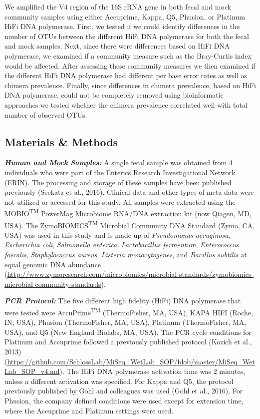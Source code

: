 \documentclass[12pt,]{article}
\begin{document}
We amplified the V4 region of the 16S rRNA gene in both fecal and mock
community samples using either Accuprime, Kappa, Q5, Phusion, or
Platinum HiFi DNA polymerase. First, we tested if we could identify
differences in the number of OTUs between the different HiFi DNA
polymerase for both the fecal and mock samples. Next, since there were
differences based on HiFi DNA polymerase, we examined if a community
measure such as the Bray-Curtis index would be affected. After assessing
these community measures we then examined if the different HiFi DNA
polymerase had different per base error rates as well as chimera
prevalence. Finally, since differences in chimera prevalence, based on
HiFi DNA polymerase, could not be completely removed using bioinformatic
approaches we tested whether the chimera prevalence correlated well with
total number of observed OTUs.

\newpage

\subsection{Materials \& Methods}\label{materials-methods}

\textbf{\emph{Human and Mock Samples:}} A single fecal sample was
obtained from 4 individuals who were part of the Enterics Research
Investigational Network (ERIN). The processing and storage of these
samples have been published previously (Seekatz et al., 2016). Clinical
data and other types of meta data were not utilized or accessed for this
study. All samples were extracted using the MOBIO\textsuperscript{TM}
PowerMag Microbiome RNA/DNA extraction kit (now Qiagen, MD, USA). The
ZymoBIOMICS\textsuperscript{TM} Microbial Community DNA Standard (Zymo,
CA, USA) was used in this study and is made up of \emph{Pseudomonas
aeruginosa}, \emph{Escherichia coli}, \emph{Salmonella enterica},
\emph{Lactobacillus fermentum}, \emph{Enterococcus faecalis},
\emph{Staphylococcus aureus}, \emph{Listeria monocytogenes}, and
\emph{Bacillus subtilis} at equal genomic DNA abundance
(\url{http://www.zymoresearch.com/microbiomics/microbial-standards/zymobiomics-microbial-community-standards}).

\textbf{\emph{PCR Protocol:}} The five different high fidelity (HiFi)
DNA polymerase that were tested were AccuPrime\textsuperscript{TM}
(ThermoFisher, MA, USA), KAPA HIFI (Roche, IN, USA), Phusion
(ThermoFisher, MA, USA), Platinum (ThermoFisher, MA, USA), and Q5 (New
England Biolabs, MA, USA). The PCR cycle conditions for Platinum and
Accuprime followed a previously published protocol (Kozich et al., 2013)
(\url{https://github.com/SchlossLab/MiSeq_WetLab_SOP/blob/master/MiSeq_WetLab_SOP_v4.md}).
The HiFi DNA polymerase activation time was 2 minutes, unless a
different activation was specified. For Kappa and Q5, the protocol
previously published by Gohl and colleagues was used (Gohl et al.,
2016). For Phusion, the company defined conditions were used except for
extension time, where the Accuprime and Platinum settings were used.
\end{document}
